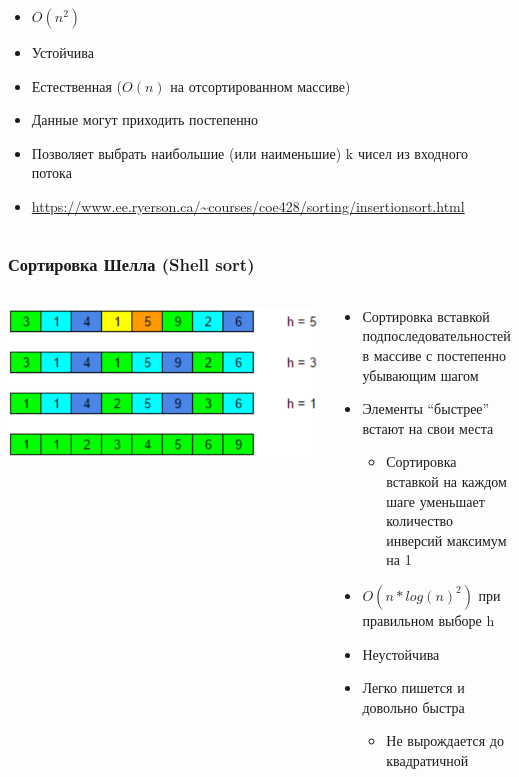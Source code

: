 \documentclass[xetex,mathserif,serif]{beamer}
\begin{document}
\begin{frame}
\begin{columns}
\begin{column}{0.75\textwidth}
				\begin{itemize}
					\item $O(n^2)$
					\item Устойчива
					\item Естественная ($O(n)$ на отсортированном массиве)
					\item Данные могут приходить постепенно
					\item Позволяет выбрать наибольшие (или наименьшие) k чисел из входного потока
					\item \url{https://www.ee.ryerson.ca/~courses/coe428/sorting/insertionsort.html}
				\end{itemize}
			\end{column}
		\end{columns}
	\end{frame}

	\begin{frame}
		\frametitle{Сортировка Шелла (Shell sort)}
		\begin{columns}
			\begin{column}{0.35\textwidth}
				\includegraphics[width=\textwidth]{shellSort.png}
			\end{column}
			\begin{column}{0.65\textwidth}
				\begin{itemize}
					\item Сортировка вставкой подпоследовательностей в массиве с постепенно убывающим шагом
					\item Элементы ``быстрее'' встают на свои места
					\begin{itemize}
						\item Сортировка вставкой на каждом шаге уменьшает количество инверсий максимум на 1
					\end{itemize}
					\item $O(n * log(n)^2)$ при правильном выборе h
					\item Неустойчива
					\item Легко пишется и довольно быстра
					\begin{itemize}
						\item Не вырождается до квадратичной
					\end{itemize}
				\end{itemize}
			\end{column}
		\end{columns}
	\end{frame}
\end{document}
